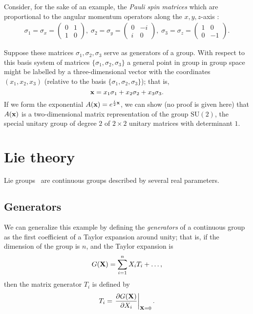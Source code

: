 {\color{blue}
\bexample
Consider, for the sake of an example, the
{\em Pauli spin matrices}
which are proportional to the angular momentum operators along the $x,y,z$-axis
\cite{schiff-55}:
\begin{equation}
\begin{split}
\sigma_1=\sigma_x
=
\begin{pmatrix}
0&1\\
1&0
\end{pmatrix}
,
\;
\sigma_2=\sigma_y
=
\begin{pmatrix}
0&-i\\
i&0
\end{pmatrix}
,
\;
\sigma_3=\sigma_z
=
\begin{pmatrix}
1&0\\
0&-1
\end{pmatrix}
.
\end{split}
\end{equation}

Suppose these matrices $\sigma_1,\sigma_2,\sigma_3$
serve as generators of a group.
With respect to this basis system of matrices $\{ \sigma_1,\sigma_2,\sigma_3\}$
a general point in group in group space might be labelled by a three-dimensional
vector with the coordinates $(x_1,x_2,x_3)$
(relative to the basis $\{ \sigma_1,\sigma_2,\sigma_3\}$);
that is,
\begin{equation}
{\bf x} =   x_1\sigma_1 + x_2\sigma_2 +x_3 \sigma_3.
\end{equation}
If we form the exponential $  A  ({\bf x})= e^{\frac{i}{2} {\bf x}}$,
we can show (no proof is given here)
that $  A  ({\bf x})$ is a two-dimensional matrix representation of the group $\textrm{SU}(2)$,
the special unitary group of degree $2$ of $2\times 2$ unitary matrices with determinant $1$.
}

\section{Lie theory}

Lie groups~\cite[-40mm]{hall-2000,hall-2015} are continuous groups described by several real parameters.

\subsection{Generators}
We can generalize this example by defining
the {\em generators}
of a continuous group as the first coefficient of a Taylor expansion
around unity; that is, if the dimension of the group is $n$, and the Taylor expansion is
\begin{equation}
  G  ({\bf X}) =   \sum_{i=1}^n X_i   T  _i + \ldots ,
\end{equation}
then the matrix generator $T_i$ is defined by
\begin{equation}
  T  _i = \left. \frac{\partial   G  ({\bf X})}{\partial X_i} \right|_{ {\bf X}=0}.
\end{equation}

